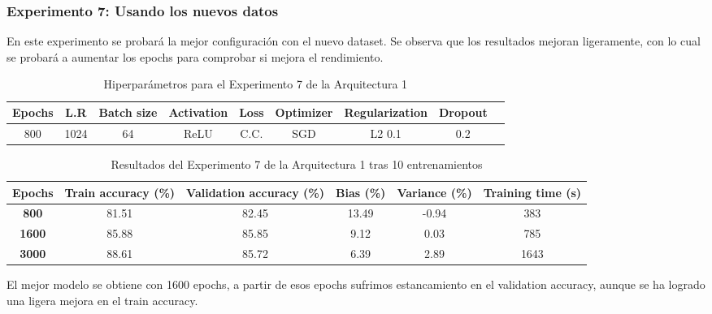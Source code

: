 \documentclass{article}
\begin{document}
    \subsubsection{Experimento 7: Usando los nuevos datos}

En este experimento se probar\'a la mejor configuraci\'on con el nuevo dataset. Se observa que los resultados mejoran ligeramente, con lo cual se probar\'a a aumentar los epochs para comprobar si mejora el rendimiento. 

     \begin{table}[!h]
				\begin{tabular}{|c|c|c|c|c|c|c|c|c|}
					\textbf{Epochs}&\textbf{L.R}&\textbf{Batch size}&\textbf{Activation}&\textbf{Loss}&\textbf{Optimizer}&\textbf{Regularization}&\textbf{Dropout}   \\ \hline
					800 & 1024  & 64 & ReLU & C.C. & SGD & L2 0.1 & 0.2 
				\end{tabular}
				\caption{Hiperpar\'ametros para el Experimento 7 de la Arquitectura 1}
				\label{tab:hip-a6-e7}
			\end{table}
    
   
   \begin{table}[!h]
				\begin{center}
					\begin{tabular}{ c | c | c | c | c | c |}
						 \textbf{Epochs} & \textbf{Train accuracy (\%)} & \textbf{Validation accuracy (\%)} & \textbf{Bias (\%)} & \textbf{Variance (\%)} & \textbf{Training time (s)} \\ \hline
                        \textbf{800} & 81.51   & 82.45 & 13.49 & -0.94  &   383   \\ \hline
                        \textbf{1600} & 85.88   & 85.85 & 9.12 & 0.03  &  785    \\ \hline
                        \textbf{3000} & 88.61   & 85.72  & 6.39 & 2.89  &  1643     \\ \hline
                       
					\end{tabular}
					\caption{Resultados del Experimento 7 de la Arquitectura 1 tras 10 entrenamientos}
					\label{tab:res-a2-e7}
				\end{center}
			\end{table}

   El mejor modelo se obtiene con 1600 epochs, a partir de esos epochs sufrimos estancamiento en el validation accuracy, aunque se ha logrado una ligera mejora en el train accuracy. 	
   
\end{document}

